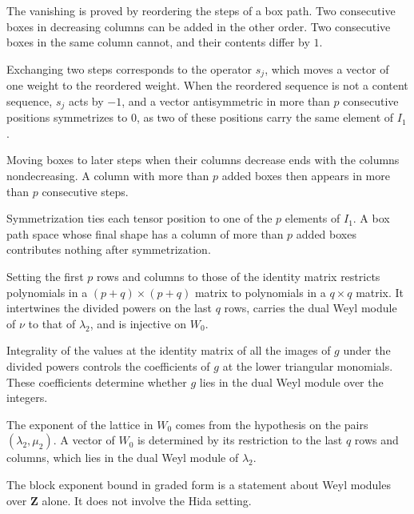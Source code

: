 The vanishing is proved by reordering the steps of a box path. Two consecutive boxes in decreasing
columns can be added in the other order. Two consecutive boxes in the same column cannot, and their
contents differ by $1$.

Exchanging two steps corresponds to the operator $s_j$, which moves a vector of one weight to the
reordered weight. When the reordered sequence is not a content sequence, $s_j$ acts by $-1$, and a vector
antisymmetric in more than $p$ consecutive positions symmetrizes to $0$, as two of these positions carry the
same element of $I_1$.

Moving boxes to later steps when their columns decrease ends with the columns nondecreasing. A column with
more than $p$ added boxes then appears in more than $p$ consecutive steps.

Symmetrization ties each tensor position to one of the $p$ elements of $I_1$. A box path space whose final
shape has a column of more than $p$ added boxes contributes nothing after symmetrization.

Setting the first $p$ rows and columns to those of the identity matrix restricts polynomials in a
$(p+q)\times(p+q)$ matrix to polynomials in a $q\times q$ matrix. It intertwines the divided powers on the last
$q$ rows, carries the dual Weyl module of $\nu$ to that of $\lambda_2$, and is injective on $W_0$.

Integrality of the values at the identity matrix of all the images of $g$ under the divided powers controls the
coefficients of $g$ at the lower triangular monomials. These coefficients determine whether $g$ lies in the
dual Weyl module over the integers.

The exponent of the lattice in $W_0$ comes from the hypothesis on the pairs $(\lambda_2,\mu_2)$. A vector of
$W_0$ is determined by its restriction to the last $q$ rows and columns, which lies in the dual Weyl
module of $\lambda_2$.

The block exponent bound in graded form is a statement about Weyl modules over $\mathbf Z$ alone. It
does not involve the Hida setting.

